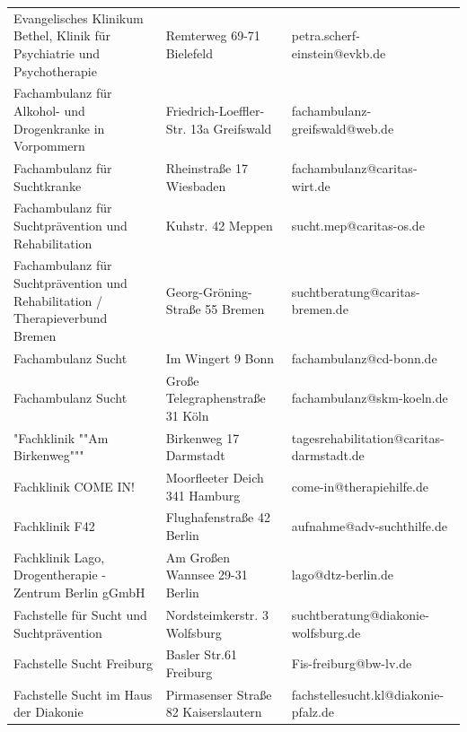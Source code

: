 {\begin{xltabular}{\textwidth} {
 >{\raggedright\arraybackslash}p{5cm}
 >{\raggedright\arraybackslash}X
 >{\raggedright\arraybackslash}p{5cm} }
Evangelisches Klinikum Bethel, Klinik für Psychiatrie und Psychotherapie & Remterweg 69-71 Bielefeld & petra.scherf-einstein@evkb.de \\
Fachambulanz für Alkohol- und Drogenkranke in Vorpommern & Friedrich-Loeffler-Str. 13a Greifswald & fachambulanz-greifswald@web.de \\
Fachambulanz für Suchtkranke & Rheinstraße 17 Wiesbaden & fachambulanz@caritas-wirt.de \\
Fachambulanz für Suchtprävention und Rehabilitation & Kuhstr. 42 Meppen & sucht.mep@caritas-os.de \\
Fachambulanz für Suchtprävention und Rehabilitation / Therapieverbund Bremen & Georg-Gröning-Straße 55 Bremen & suchtberatung@caritas-bremen.de \\
Fachambulanz Sucht & Im Wingert 9 Bonn & fachambulanz@cd-bonn.de \\
Fachambulanz Sucht & Große Telegraphenstraße 31 Köln & fachambulanz@skm-koeln.de \\
"Fachklinik ""Am Birkenweg""" & Birkenweg 17 Darmstadt & tagesrehabilitation@caritas-darmstadt.de \\
Fachklinik COME IN! & Moorfleeter Deich 341 Hamburg & come-in@therapiehilfe.de \\
Fachklinik F42 & Flughafenstraße 42 Berlin & aufnahme@adv-suchthilfe.de \\
Fachklinik Lago, Drogentherapie - Zentrum Berlin gGmbH & Am Großen Wannsee 29-31 Berlin & lago@dtz-berlin.de \\
Fachstelle für Sucht und Suchtprävention & Nordsteimkerstr. 3 Wolfsburg & suchtberatung@diakonie-wolfsburg.de \\
Fachstelle Sucht Freiburg & Basler Str.61 Freiburg & Fis-freiburg@bw-lv.de \\
Fachstelle Sucht im Haus der Diakonie & Pirmasenser Straße 82 Kaiserslautern & fachstellesucht.kl@diakonie-pfalz.de \\

\end{xltabular}}
